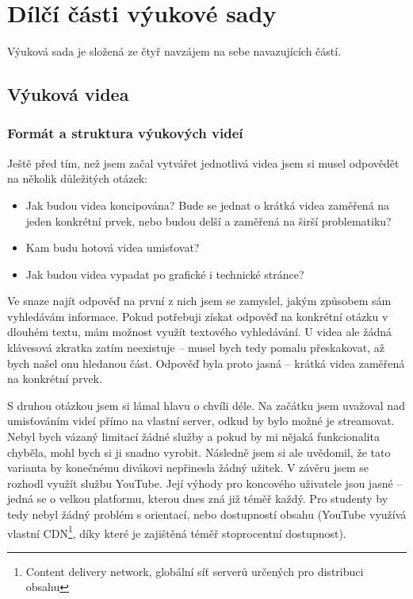 \chapter{Dílčí části výukové sady}
Výuková sada je složená ze čtyř navzájem na sebe navazujících částí.
\fxnote[inline=true]{\textcolor{mygreen}{Sem ještě něco dopíšu, jen zatím nevím co...}}

\section{Výuková videa}
\fxnote[inline=true]{\textcolor{mygreen}{Sem ještě něco dopíšu, jen zatím nevím co...}}

\subsection{Formát a struktura výukových videí}
Ještě před tím, než jsem začal vytvářet jednotlivá videa jsem si musel odpovědět na několik důležitých otázek:
\begin{itemize}[topsep=0pt]
    \setlength\itemsep{0em}
    \item Jak budou videa koncipována? Bude se jednat o krátká videa zaměřená na jeden konkrétní prvek, nebo budou delší a zaměřená na širší problematiku?
    \item Kam budu hotová videa umisťovat?
    \item Jak budou videa vypadat po grafické i technické stránce?
\end{itemize}

Ve snaze najít odpověď na první z nich jsem se zamyslel, jakým způsobem sám vyhledávám informace.
Pokud potřebuji získat odpověď na konkrétní otázku v dlouhém textu, mám možnost využít textového vyhledávání. 
U videa ale žádná klávesová zkratka  zatím neexistuje -- musel bych tedy pomalu přeskakovat, až bych našel onu hledanou část.
Odpověď byla proto jasná -- krátká videa zaměřená na konkrétní prvek.

S druhou otázkou jsem si lámal hlavu o chvíli déle.
Na začátku jsem uvažoval nad umisťováním videí přímo na vlastní server, odkud by bylo možné je streamovat.
Nebyl bych vázaný limitací žádné služby a pokud by mi nějaká funkcionalita chyběla, mohl bych si ji snadno vyrobit.
Následně jsem si ale uvědomil, že tato varianta by konečnému divákovi nepřinesla žádný užitek.
V závěru jsem se rozhodl využít službu YouTube.
Její výhody pro koncového uživatele jsou jasné -- jedná se o velkou platformu, kterou dnes zná již téměř každý.
Pro studenty by tedy nebyl žádný problém s orientací, nebo dostupností obsahu (YouTube využívá vlastní CDN\footnote{Content delivery network, globální síť serverů určených pro distribuci obsahu}, díky které je zajištěná téměř stoprocentní dostupnost).

